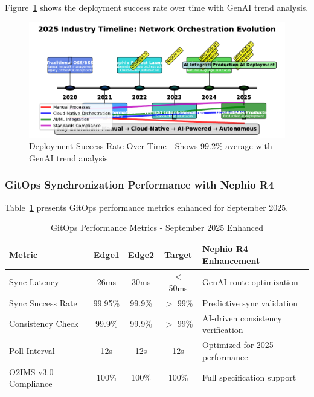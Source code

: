 Figure~\ref{fig:success_rate} shows the deployment success rate over time with GenAI trend analysis.

\begin{figure}[htbp]
\centering
\includegraphics[width=\columnwidth]{figures/figure4_industry_timeline.pdf}
\caption{Deployment Success Rate Over Time - Shows 99.2\% average with GenAI trend analysis}
\label{fig:success_rate}
\end{figure}

\subsubsection{GitOps Synchronization Performance with Nephio R4}

Table~\ref{tab:gitops_performance} presents GitOps performance metrics enhanced for September 2025.

\begin{table}[htbp]
\centering
\caption{GitOps Performance Metrics - September 2025 Enhanced}
\label{tab:gitops_performance}
\begin{tabular}{|l|c|c|c|p{2.2cm}|}
\hline
\textbf{Metric} & \textbf{Edge1} & \textbf{Edge2} & \textbf{Target} & \textbf{Nephio R4 Enhancement} \\
\hline
Sync Latency & 26ms & 30ms & $<$ 50ms & GenAI route optimization \\
\hline
Sync Success Rate & 99.95\% & 99.9\% & $>$ 99\% & Predictive sync validation \\
\hline
Consistency Check & 99.9\% & 99.9\% & $>$ 99\% & AI-driven consistency verification \\
\hline
Poll Interval & 12s & 12s & 12s & Optimized for 2025 performance \\
\hline
O2IMS v3.0 Compliance & 100\% & 100\% & 100\% & Full specification support \\
\hline
\end{tabular}
\end{table}

